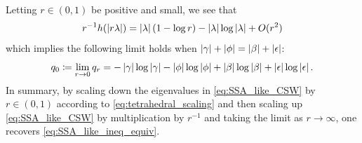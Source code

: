 \documentclass[notitlepage, 10pt]{article}
\begin{document}
\begin{rem}
    Letting $r \in (0,1)$ be positive and small, we see that
    \begin{equation}
        r^{-1}h(\left|r\lambda\right|) = \left|\lambda\right|(1-\log r) - \left|\lambda\right| \log \left|\lambda\right| + O(r^2)
    \end{equation}
    which implies the following limit holds when $\left|\gamma\right| + \left|\phi\right| = \left|\beta\right| + \left|\epsilon\right|$:
    \begin{equation}
        q_0 \coloneqq 
        \lim_{r \to 0} q_{r}  
        =
        -\left|\gamma\right|\log\left|\gamma\right|
        -\left|\phi\right|\log\left|\phi\right|
        +\left|\beta\right|\log\left|\beta\right|
        +\left|\epsilon\right|\log\left|\epsilon\right|.
    \end{equation}
    In summary, by scaling down the eigenvalues in \cref{eq:SSA_like_CSW} by $r \in (0,1)$ according to \cref{eq:tetrahedral_scaling} and then scaling up \cref{eq:SSA_like_CSW} by multiplication by $r^{-1}$ and taking the limit as $r \to \infty$, one recovers \cref{eq:SSA_like_ineq_equiv}.
    

\end{rem}
\end{document}
